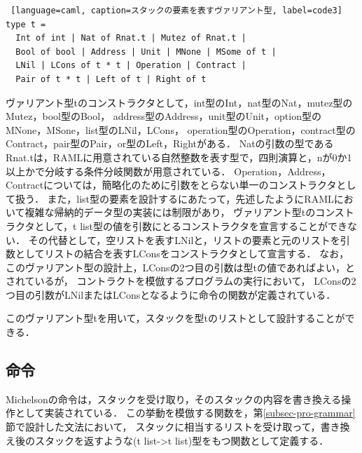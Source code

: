 \documentclass{kuisthesis}
\begin{document}
\begin{lstlisting} [language=caml, caption=スタックの要素を表すヴァリアント型, label=code3]
type t =
  Int of int | Nat of Rnat.t | Mutez of Rnat.t |
  Bool of bool | Address | Unit | MNone | MSome of t |
  LNil | LCons of t * t | Operation | Contract |
  Pair of t * t | Left of t | Right of t 
\end{lstlisting}


ヴァリアント型tのコンストラクタとして，int型のInt，nat型のNat，mutez型のMutez，bool型のBool，
address型のAddress，unit型のUnit，option型のMNone，MSone，list型のLNil，LCons，
operation型のOperation，contract型のContract，pair型のPair，or型のLeft，Rightがある．
Natの引数の型であるRnat.tは，RAMLに用意されている自然整数を表す型で，四則演算と，nが0か1以上かで分岐する条件分岐関数が用意されている．
Operation，Address，Contractについては，簡略化のために引数をとらない単一のコンストラクタとして扱う．
また，list型の要素を設計するにあたって，先述したようにRAMLにおいて複雑な帰納的データ型の実装には制限があり，
ヴァリアント型tのコンストラクタとして，t list型の値を引数にとるコンストラクタを宣言することができない．
その代替として，空リストを表すLNilと，リストの要素と元のリストを引数としてリストの結合を表すLConsをコンストラクタとして宣言する．
なお，このヴァリアント型の設計上，LConsの2つ目の引数は型tの値であればよい，とされているが，
コントラクトを模倣するプログラムの実行において，
LConsの2つ目の引数がLNilまたはLConsとなるように命令の関数が定義されている．

このヴァリアント型tを用いて，スタックを型tのリストとして設計することができる．

\subsection{命令} \label{subsec-pro-instr}
Michelsonの命令は，スタックを受け取り，そのスタックの内容を書き換える操作として実装されている．
この挙動を模倣する関数を，第\ref{subsec-pro-grammar}節で設計した文法において，
スタックに相当するリストを受け取って，書き換え後のスタックを返すような(t list->t list)型をもつ関数として定義する．
\end{document}
